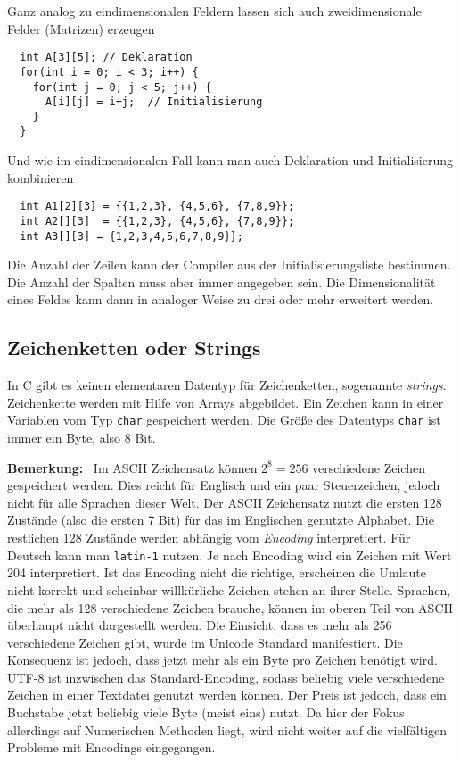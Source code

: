Ganz analog zu eindimensionalen Feldern lassen sich auch zweidimensionale Felder (Matrizen) erzeugen
\begin{lstlisting}
  int A[3][5]; // Deklaration
  for(int i = 0; i < 3; i++) {
    for(int j = 0; j < 5; j++) {
      A[i][j] = i+j;  // Initialisierung
    }
  }
\end{lstlisting}
Und wie im eindimensionalen Fall kann man auch Deklaration und Initialisierung kombinieren
\begin{lstlisting}
  int A1[2][3] = {{1,2,3}, {4,5,6}, {7,8,9}};
  int A2[][3]  = {{1,2,3}, {4,5,6}, {7,8,9}};
  int A3[][3] = {1,2,3,4,5,6,7,8,9}};
\end{lstlisting}
Die Anzahl der Zeilen kann der Compiler aus der Initialisierungsliste bestimmen.
Die Anzahl der Spalten muss aber immer angegeben sein.
Die Dimensionalität eines Feldes kann dann in analoger Weise zu drei oder mehr erweitert werden.

\subsection{Zeichenketten oder Strings}

In C gibt es keinen elementaren Datentyp für Zeichenketten, sogenannte \emph{strings}.
Zeichenkette werden mit Hilfe von Arrays abgebildet.
Ein Zeichen kann in einer Variablen vom Typ \verb|char| gespeichert werden.
Die Größe des Datentyps \texttt{char} ist immer ein Byte, also 8 Bit.

\textbf{Bemerkung:}~ Im ASCII Zeichensatz können $2^8= 256$ verschiedene Zeichen gespeichert werden.
Dies reicht für Englisch und ein paar Steuerzeichen, jedoch nicht für alle Sprachen dieser Welt.
Der ASCII Zeichensatz nutzt die ersten 128 Zustände (also die ersten 7 Bit) für das im Englischen genutzte Alphabet.
Die restlichen 128 Zustände werden abhängig vom  \emph{Encoding} interpretiert.
Für Deutsch kann man \texttt{latin-1} nutzen.
Je nach Encoding wird ein Zeichen mit Wert 204 interpretiert.
Ist das Encoding nicht die richtige, erscheinen die Umlaute
nicht korrekt und scheinbar willkürliche Zeichen stehen an ihrer Stelle.
Sprachen, die mehr als 128 verschiedene Zeichen brauche, können im oberen
Teil von ASCII überhaupt nicht dargestellt werden. Die Einsicht, dass es
mehr als 256 verschiedene Zeichen gibt, wurde im Unicode Standard
manifestiert. Die Konsequenz ist jedoch, dass jetzt mehr als ein Byte pro
Zeichen benötigt wird. UTF-8 ist inzwischen das Standard-Encoding, sodass
beliebig viele verschiedene Zeichen in einer Textdatei genutzt werden
können. Der Preis ist jedoch, dass ein Buchstabe jetzt beliebig viele Byte
(meist eins) nutzt. Da hier der Fokus allerdings auf Numerischen Methoden
liegt, wird nicht weiter auf die vielfältigen Probleme mit Encodings
eingegangen.

